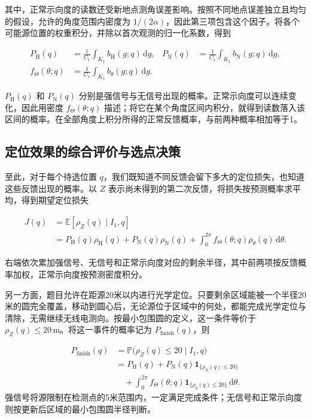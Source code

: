 \documentclass[UTF8,a4paper,zihao=-4,fontset=none]{ctexart}
\begin{document}
其中，正常示向度的读数还受新地点测角误差影响。按照不同地点误差独立且均匀的假设，允许的角度范围内密度为 \(1/(2\alpha)\)，因此第三项包含这个因子。将各个可能源位置的权重积分，并除以首次观测的归一化系数，得到

\begin{equation}
\begin{aligned}
 P_{\mathrm H}(q)&=\frac{1}{C_1}\int_{K_1}b_{\mathrm H}(g;q)\,\mathrm dg,
 &P_{\mathrm N}(q)&=\frac{1}{C_1}\int_{K_1}b_{\mathrm N}(g;q)\,\mathrm dg,\\
 f_\Theta(\theta;q)&=\frac{1}{C_1}\int_{K_1}b_\theta(g;q)\,\mathrm dg.
\end{aligned}
\label{eq:q2-pair-prediction}
\end{equation}

\(P_{\mathrm H}(q)\) 和 \(P_{\mathrm N}(q)\) 分别是强信号与无信号出现的概率。正常示向度可以连续变化，因此用密度 \(f_\Theta(\theta;q)\) 描述；将它在某个角度区间内积分，就得到读数落入该区间的概率。在全部角度上积分所得的正常反馈概率，与前两种概率相加等于1。

\subsection{定位效果的综合评价与选点决策}

至此，对于每个待选位置 \(q\)，我们既知道不同反馈会留下多大的定位损失，也知道这些反馈出现的概率。以 \(Z\) 表示尚未得到的第二次反馈，将损失按预测概率求平均，得到期望定位损失

\begin{equation}
\begin{aligned}
 J(q)&=\mathbb E[\rho_Z(q)\mid I_1,q]\\
 &=P_{\mathrm H}(q)\rho_{\mathrm H}(q)+P_{\mathrm N}(q)\rho_{\mathrm N}(q)
 +\int_0^{2\pi}f_\Theta(\theta;q)\rho_\theta(q)\,\mathrm d\theta.
\end{aligned}
\label{eq:q2-pair-expected-objective}
\end{equation}

右端依次累加强信号、无信号和正常示向度对应的剩余半径，其中前两项按反馈概率加权，正常示向度按预测密度积分。

另一方面，题目允许在距源20米以内进行光学定位。只要剩余区域能被一个半径20米的圆完全覆盖，移动到圆心后，无论源位于区域中的何处，都能完成光学定位与清除，无需继续无线电测向。按最小包围圆的定义，这一条件等价于 \(\rho_Z(q)\le20\,\mathrm{m}\)。将这一事件的概率记为 \(P_{\mathrm{finish}}(q)\)，则

\begin{equation}
\begin{aligned}
 P_{\mathrm{finish}}(q)
 &=\mathbb{P}\bigl(\rho_Z(q)\le20\mid I_1,q\bigr)\\
 &=P_{\mathrm H}(q)+P_{\mathrm N}(q)\mathbf1_{\{\rho_{\mathrm N}(q)\le20\}}\\
 &\quad+\int_0^{2\pi}f_\Theta(\theta;q)\mathbf1_{\{\rho_\theta(q)\le20\}}\,\mathrm d\theta.
\end{aligned}
\label{eq:q2-completion-probability}
\end{equation}
强信号将源限制在检测点的5米范围内，一定满足完成条件；无信号和正常示向度则按更新后区域的最小包围圆半径判断。
\end{document}
